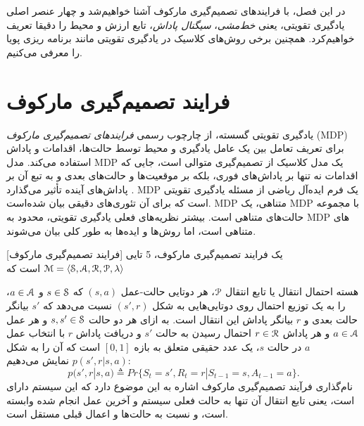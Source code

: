 
  در این فصل، با فرایندهای تصمیم‌گیری مارکوف آشنا خواهیم‌شد و چهار عنصر اصلی یادگیری تقویتی، یعنی \textit{خط‌مشی}، \textit{سیگنال پاداش}، تابع ارزش و محیط را دقیقا تعریف خواهیم‌کرد. همچنین برخی روش‌های کلاسیک در یادگیری تقویتی مانند برنامه ریزی پویا را معرفی می‌کنیم.



\section{فرایند تصمیم‌گیری مارکوف}

یادگیری تقویتی گسسته، از چارچوب رسمی \textit{فرایندهای تصمیم‌گیری مارکوف} 
 (MDP)
 برای تعریف تعامل بین یک عامل یادگیری و محیط توسط حالت‌ها، اقدامات و پاداش استفاده می‌کند. مدل MDP یک مدل کلاسیک از تصمیم‌گیری متوالی است، جایی که اقدامات نه تنها بر پاداش‌های فوری، بلکه بر موقعیت‌ها و حالت‌های بعدی و به تبع آن بر پاداش‌های آینده تأثیر می‌گذارد
 \cite{suttonbook}.
MDP
 یک فرم ایده‌آل ریاضی از مسئله یادگیری تقویتی است که برای آن تئوری‌های دقیقی بیان شده‌است.
MDP متناهی،
 یک MDP با مجموعه حالت‌های متناهی است. 
بیشتر نظریه‌های فعلی یادگیری تقویتی، محدود به MDP  های متناهی است، اما روش‌ها و ایده‌ها به طور کلی بیان می‌شوند.


[فرایند تصمیم‌گیری مارکوف] 
یک فرایند تصمیم‌گیری مارکوف، 5 تایی 
$\EuScript{M} = \left< \EuScript{S},\EuScript{A},\EuScript{R},\EuScript{P}, \lambda \right>$
است که

هسته احتمال انتقال یا تابع انتقال $\EuScript{P}$، هر دوتایی حالت-عمل
$(s,a)$ که 
$s \in \EuScript{S}$
و
$a \in \EuScript{A}$، را به یک توزیع احتمال روی دوتایی‌هایی به شکل 
$(s',r)$
نسبت می‌دهد که $s'$ بیانگر حالت بعدی و $r$ بیانگر پاداش این انتقال است. به ازای هر دو حالت 
$s,s' \in \EuScript{S}$
 و هر عمل 
 $a \in \EuScript{A}$
  و هر پاداش 
  $r \in \EuScript{R}$
  احتمال رسیدن به حالت $s'$ و دریافت پاداش $r$ با انتخاب عمل $a$ در حالت $s$، یک عدد حقیقی متعلق به  بازه $[0,1]$ است که آن را به شکل
$p(s',r|s,a)$
نمایش می‌دهیم:
$$p(s',r|s,a) \triangleq Pr\{S_t=s',R_t=r|S_{t-1}=s,A_{t-1}=a\}.$$ 
نام‌گذاری فرآیند تصمیم‌گیری مارکوف اشاره به این موضوع دارد که این سیستم‌ دارای   است، یعنی تابع انتقال آن تنها به حالت فعلی سیستم و آخرین عمل انجام شده وابسته است، و نسبت به حالت‌ها و اعمال قبلی مستقل است.

